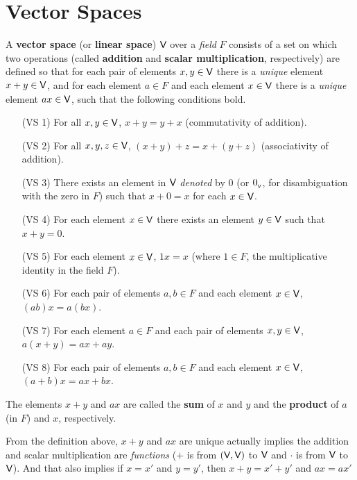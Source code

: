 \section{Vector Spaces} \label{sec 1.2}

\begin{definition} \label{def 1.1}
A \textbf{vector space} (or \textbf{linear space}) \(\textsf{V}\) over a \emph{field} \(F\) consists of a set on which two operations (called \textbf{addition} and \textbf{scalar multiplication}, respectively) are defined
so that for each pair of elements \(x, y \in \textsf{V}\) there is a \emph{unique} element \(x + y \in \textsf{V}\),
and for each element \(a \in F\) and each element \(x \in \textsf{V}\) there is a \emph{unique} element \(ax \in \textsf{V}\), such that the following conditions bold.
\begin{itemize}
    \item[(VS 1)] For all \(x, y \in \textsf{V}\), \(x + y = y + x\) (commutativity of addition).
    \item[(VS 2)] For all \(x, y, z \in \textsf{V}\), \((x + y) + z = x + (y + z)\) (associativity of addition).
    \item[(VS 3)] There exists an element in \(\textsf{V}\) \emph{denoted} by \(0\) (or \(0_{_{\textsf{V}}}\), for disambiguation with the zero in \(F\)) such that \(x + 0 = x\) for each \(x \in \textsf{V}\).
    \item[(VS 4)] For each element \(x \in \textsf{V}\) there exists an element \(y \in \textsf{V}\) such that \(x + y = 0\).
    \item[(VS 5)] For each element \(x \in \textsf{V}\), \(1 x = x\) (where \(1 \in F\), the multiplicative identity in the field \(F\)).
    \item[(VS 6)] For each pair of elements \(a, b \in F\) and each element \(x \in \textsf{V}\), \((ab)x = a(bx)\).
    \item[(VS 7)] For each element \(a \in F\) and each pair of elements \(x, y \in \textsf{V}\), \(a(x + y) = ax + ay\).
    \item[(VS 8)] For each pair of elements \(a, b \in F\) and each element \(x \in \textsf{V}\), \((a + b)x = ax+ bx\).
\end{itemize}
The elements \(x + y\) and \(ax\) are called the \textbf{sum} of \(x\) and \(y\) and the \textbf{product} of \(a\) (in \(F\)) and \(x\), respectively.
\end{definition}

\begin{remark}
From the definition above, \(x + y\) and \(ax\) are unique actually implies the addition and scalar multiplication are \emph{functions} (\(+\) is from \((\textsf{V}, \textsf{V})\) to \(\textsf{V}\) and \(\cdot\) is from \(\textsf{V}\) to \(\textsf{V}\)).
And that also implies if \(x = x'\) and \(y = y'\), then \(x + y = x' + y'\) and \(ax = ax'\)
\end{remark}


